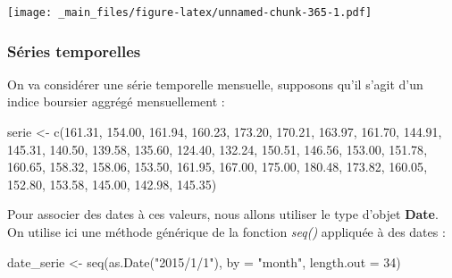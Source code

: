 \documentclass[
]{book}
\newenvironment{Shaded}{\begin{snugshade}}{\end{snugshade}}
\newcommand{\AttributeTok}[1]{\textcolor[rgb]{0.77,0.63,0.00}{#1}}
\newcommand{\DecValTok}[1]{\textcolor[rgb]{0.00,0.00,0.81}{#1}}
\newcommand{\FloatTok}[1]{\textcolor[rgb]{0.00,0.00,0.81}{#1}}
\newcommand{\FunctionTok}[1]{\textcolor[rgb]{0.00,0.00,0.00}{#1}}
\newcommand{\NormalTok}[1]{#1}
\newcommand{\OtherTok}[1]{\textcolor[rgb]{0.56,0.35,0.01}{#1}}
\newcommand{\StringTok}[1]{\textcolor[rgb]{0.31,0.60,0.02}{#1}}
\theoremstyle{definition}
\theoremstyle{definition}
\theoremstyle{definition}
\theoremstyle{definition}
\theoremstyle{remark}
\begin{document}
\texttt{[image: \_main\_files/figure-latex/unnamed-chunk-365-1.pdf]}

\hypertarget{suxe9ries-temporelles-1}{%
\subsubsection{Séries temporelles}\label{suxe9ries-temporelles-1}}

On va considérer une série temporelle mensuelle, supposons qu'il s'agit d'un indice boursier aggrégé mensuellement :

\begin{Shaded}
\begin{Highlighting}[]
\NormalTok{serie }\OtherTok{\textless{}{-}} \FunctionTok{c}\NormalTok{(}\FloatTok{161.31}\NormalTok{, }\FloatTok{154.00}\NormalTok{, }\FloatTok{161.94}\NormalTok{, }\FloatTok{160.23}\NormalTok{, }\FloatTok{173.20}\NormalTok{, }\FloatTok{170.21}\NormalTok{, }\FloatTok{163.97}\NormalTok{, }\FloatTok{161.70}\NormalTok{, }
           \FloatTok{144.91}\NormalTok{, }\FloatTok{145.31}\NormalTok{, }\FloatTok{140.50}\NormalTok{, }\FloatTok{139.58}\NormalTok{, }\FloatTok{135.60}\NormalTok{, }\FloatTok{124.40}\NormalTok{, }\FloatTok{132.24}\NormalTok{, }\FloatTok{150.51}\NormalTok{, }
           \FloatTok{146.56}\NormalTok{, }\FloatTok{153.00}\NormalTok{, }\FloatTok{151.78}\NormalTok{, }\FloatTok{160.65}\NormalTok{, }\FloatTok{158.32}\NormalTok{, }\FloatTok{158.06}\NormalTok{, }\FloatTok{153.50}\NormalTok{, }\FloatTok{161.95}\NormalTok{, }
           \FloatTok{167.00}\NormalTok{, }\FloatTok{175.00}\NormalTok{, }\FloatTok{180.48}\NormalTok{, }\FloatTok{173.82}\NormalTok{, }\FloatTok{160.05}\NormalTok{, }\FloatTok{152.80}\NormalTok{, }\FloatTok{153.58}\NormalTok{, }\FloatTok{145.00}\NormalTok{, }
           \FloatTok{142.98}\NormalTok{, }\FloatTok{145.35}\NormalTok{)}
\end{Highlighting}
\end{Shaded}

Pour associer des dates à ces valeurs, nous allons utiliser le type d'objet \textbf{Date}. On utilise ici une méthode générique de la fonction \emph{seq()} appliquée à des dates :

\begin{Shaded}
\begin{Highlighting}[]
\NormalTok{date\_serie }\OtherTok{\textless{}{-}} \FunctionTok{seq}\NormalTok{(}\FunctionTok{as.Date}\NormalTok{(}\StringTok{"2015/1/1"}\NormalTok{), }\AttributeTok{by =} \StringTok{"month"}\NormalTok{, }\AttributeTok{length.out =} \DecValTok{34}\NormalTok{)}
\end{Highlighting}
\end{Shaded}
\end{document}
